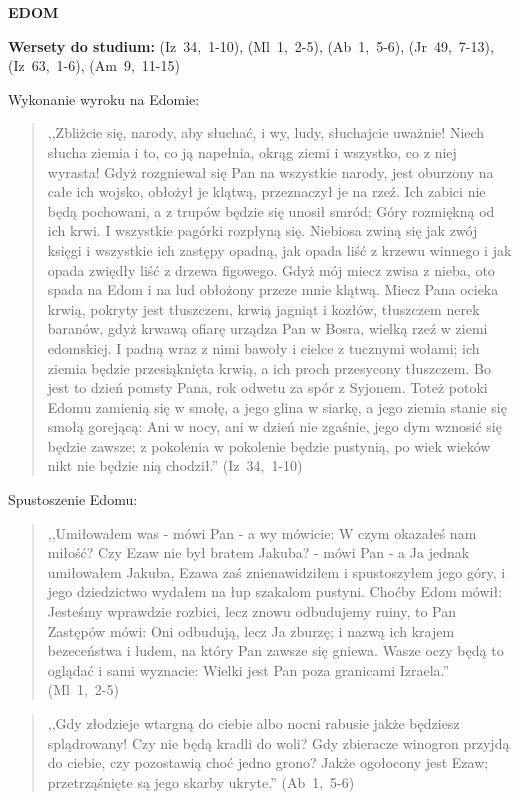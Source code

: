 \documentclass[10pt,a4paper,oneside]{article}
\begin{document}
\centerline{\textbf{\MakeUppercase{Edom}}}
\begin{center}
\textbf{Wersety do studium:} \mbox{(Iz 34, 1-10)}, \mbox{(Ml 1, 2-5)}, \mbox{(Ab 1, 5-6)}, \mbox{(Jr 49, 7-13)}, \mbox{(Iz 63, 1-6)}, \mbox{(Am 9, 11-15)}
\end{center}
Wykonanie wyroku na Edomie:
\begin{quote}
,,Zbliżcie się, narody, aby słuchać, i wy, ludy, słuchajcie uważnie! Niech słucha ziemia i to, co ją napełnia, okrąg ziemi i wszystko, co z niej wyrasta! Gdyż rozgniewał się Pan na wszystkie narody, jest oburzony na całe ich wojsko, obłożył je klątwą, przeznaczył je na rzeź. Ich zabici nie będą pochowani, a z trupów będzie się unosił smród; Góry rozmiękną od ich krwi. I wszystkie pagórki rozpłyną się. Niebiosa zwiną się jak zwój księgi i wszystkie ich zastępy opadną, jak opada liść z krzewu winnego i jak opada zwiędły liść z drzewa figowego. Gdyż mój miecz zwisa z nieba, oto spada na Edom i na lud obłożony przeze mnie klątwą. Miecz Pana ocieka krwią, pokryty jest tłuszczem, krwią jagniąt i kozłów, tłuszczem nerek baranów, gdyż krwawą ofiarę urządza Pan w Bosra, wielką rzeź w ziemi edomskiej. I padną wraz z nimi bawoły i cielce z tucznymi wołami; ich ziemia będzie przesiąknięta krwią, a ich proch przesycony tłuszczem. Bo jest to dzień pomsty Pana, rok odwetu za spór z Syjonem. Toteż potoki Edomu zamienią się w smołę, a jego glina w siarkę, a jego ziemia stanie się smołą gorejącą: Ani w nocy, ani w dzień nie zgaśnie, jego dym wznosić się będzie zawsze; z pokolenia w pokolenie będzie pustynią, po wiek wieków nikt nie będzie nią chodził.'' \mbox{(Iz 34, 1-10)}
\end{quote}
Spustoszenie Edomu:
\begin{quote}
,,Umiłowałem was - mówi Pan - a wy mówicie: W czym okazałeś nam miłość? Czy Ezaw nie był bratem Jakuba? - mówi Pan - a Ja jednak umiłowałem Jakuba, Ezawa zaś znienawidziłem i spustoszyłem jego góry, i jego dziedzictwo wydałem na łup szakalom pustyni. Choćby Edom mówił: Jesteśmy wprawdzie rozbici, lecz znowu odbudujemy ruiny, to Pan Zastępów mówi: Oni odbudują, lecz Ja zburzę; i nazwą ich krajem bezeceństwa i ludem, na który Pan zawsze się gniewa. Wasze oczy będą to oglądać i sami wyznacie: Wielki jest Pan poza granicami Izraela.'' \mbox{(Ml 1, 2-5)}
\end{quote}
\begin{quote}
,,Gdy złodzieje wtargną do ciebie albo nocni rabusie jakże będziesz splądrowany! Czy nie będą kradli do woli? Gdy zbieracze winogron przyjdą do ciebie, czy pozostawią choć jedno grono? Jakże ogołocony jest Ezaw; przetrząśnięte są jego skarby ukryte.'' \mbox{(Ab 1, 5-6)}
\end{quote}
\end{document}
